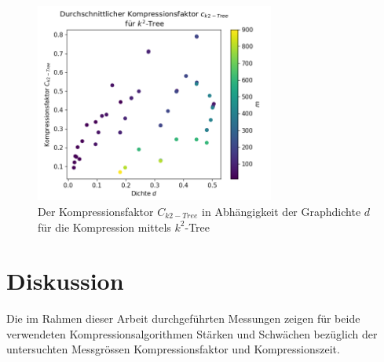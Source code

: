 \documentclass{ffhsthesis}
\begin{document}
\begin{figure}[H]
    \centering
    \includegraphics[width=0.7\textwidth]{images/avg_k2tree_compression_density_no_outliers_color.png}
    \caption{Der Kompressionsfaktor $C_{k2-Tree}$ in Abhängigkeit der Graphdichte $d$ für die Kompression mittels $k^2$-Tree}
    \label{fig:compression_factor-k2_2}
\end{figure}

\chapter{Diskussion} %
Die im Rahmen dieser Arbeit durchgeführten Messungen zeigen für beide verwendeten Kompressionsalgorithmen Stärken und Schwächen bezüglich der untersuchten Messgrössen Kompressionsfaktor und Kompressionszeit. 
\end{document}
